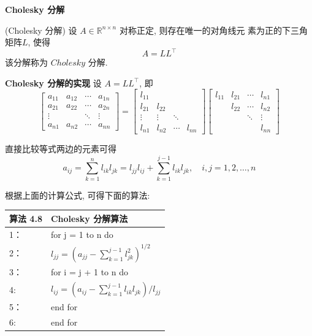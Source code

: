 \documentclass[12pt,a4paper]{article}
\begin{document}
{\bfseries Cholesky 分解}

\begin{framed}
	\begin{theorem}(Cholesky 分解)
	设 $A ∈ \mathbb{R}^{n×n}$ 对称正定, 则存在唯一的对角线元
	素为正的下三角矩阵$ L$, 使得
	$$
	A=L L^{\top}
	$$
	该分解称为 $Cholesky$ 分解.	
	\end{theorem}
\end{framed}

{\bfseries Cholesky 分解的实现}
设 $A = LL^{⊺}$, 即
\begin{equation}
\left[\begin{array}{cccc}{a_{11}} & {a_{12}} & {\cdots} & {a_{1 n}} \\ {a_{21}} & {a_{22}} & {\cdots} & {a_{2 n}} \\ {\vdots} & {} & {\ddots} & {\vdots} \\ {a_{n 1}} & {a_{n 2}} & {\cdots} & {a_{n n}}\end{array}\right]=\left[\begin{array}{cccc}{l_{11}} & {} & {} & {} \\ {l_{21}} & {l_{22}} & {} & {} \\ {\vdots} & {\vdots} & {\ddots} & {} \\ {l_{n 1}} & {l_{n 2}} & {\cdots} & {l_{n n}}\end{array}\right]\left[\begin{array}{cccc}{l_{11}} & {l_{21}} & {\cdots} & {l_{n 1}} \\ {} & {l_{22}} & {\cdots} & {l_{n 2}} \\{}& {} & {\ddots} & {\vdots} \\{} &{} & {} & {l_{n n}}\end{array}\right]
\end{equation}

直接比较等式两边的元素可得
\begin{equation}
a_{i j}=\sum_{k=1}^{n} l_{i k} l_{j k}=l_{j j} l_{i j}+\sum_{k=1}^{j-1} l_{i k} l_{j k}, \quad i, j=1,2, \ldots, n
\end{equation}

根据上面的计算公式, 可得下面的算法:

\begin{table}  
	\begin{tabular*}{16cm}{ll}  
		\hline  
		算法 4.8 & Cholesky 分解算法\\  
		\hline  
		1：   & for j = 1 to n do\\  
		2：   & \qquad $l_{j j}=\left(a_{j j}-\sum_{k=1}^{j-1} l_{j k}^{2}\right)^{1 / 2}$\\
		3：   & \qquad for i = j + 1 to n do\\
		4:    & \qquad \qquad$l_{i j}=\left(a_{i j}-\sum_{k=1}^{j-1} l_{i k} l_{j k}\right) / l_{j j}$\\
		5：   & \qquad end for\\
		6:    & end for\\
		\hline  
	\end{tabular*}  
\end{table}
\end{document}
